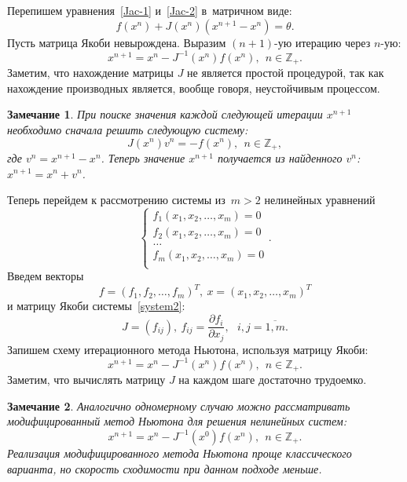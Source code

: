 \documentclass[11pt,a4paper,twoside,listtotoc,bibtotoc]{report}
\numberwithin{equation}{section}
\theoremstyle{definition}
\theoremstyle{plain}
\newtheorem*{note*}{Замечание}
\begin{document}
%
Перепишем уравнения~\eqref{Jac-1} и~\eqref{Jac-2} в~матричном виде:
%
\begin{equation}
%
    \label{matr_system1}
    f(x^n) + J(x^n)(x^{n + 1} - x^n) = \theta.
%
\end{equation}
%
Пусть матрица Якоби невырождена. Выразим $(n+1)$-ую итерацию
через $n$-ую:
%
\begin{equation}
%
    \label{matr_system2}
    x^{n + 1} = x^n - J^{-1}(x^n)f(x^n), ~~n\in\mathbb{Z_+}.
%
\end{equation}
%
Заметим, что нахождение матрицы $J$ не является простой процедурой, так как
нахождение производных является, вообще говоря, неустойчивым процессом.
%
\begin{note*}
%
При поиске значения каждой следующей итерации $x^{n + 1}$ необходимо сначала
решить следующую систему:
%
$$
    J(x^n)v^n = -f(x^n), ~~n\in\mathbb{Z_+},
$$
%
где $v^n = x^{n + 1} - x^n$. Теперь значение $x^{n + 1}$ получается из
найденного $v^n$: $x^{n + 1} = x^n + v^n$.
%
\end{note*}
%
Теперь перейдем к рассмотрению системы из~$m>2$ нелинейных уравнений
%
\begin{equation}
    \label{system2}
    \begin{cases}
        f_1(x_1,x_2,\dots,x_m) = 0 \\
        f_2(x_1,x_2,\dots,x_m) = 0 \\
        \dots \\
        f_m(x_1,x_2,\dots,x_m) = 0 \\
    \end{cases}.
\end{equation}
%
Введем векторы
%
$$
    f = (f_1,f_2,\dots,f_m)^T , ~x = (x_1,x_2,\dots,x_m)^T
$$
%
и матрицу Якоби системы~\eqref{system2}:
%
$$
    J = (f_{ij}),~f_{ij} = \frac{\partial f_i}{\partial x_j},
    ~~~i,j = \overline{1,m}.
$$
%
Запишем схему итерационного метода Ньютона, используя матрицу Якоби:
%
$$
    x^{n + 1} = x^n - J^{-1}(x^n)f(x^n), ~~n\in\mathbb{Z_+}.
$$
%
Заметим, что вычислять матрицу $J$ на каждом шаге достаточно трудоемко.

%
\begin{note*}
%
Аналогично одномерному случаю можно рассматривать модифицированный метод
Ньютона для решения нелинейных систем:
%
$$
    x^{n + 1} = x^n - J^{-1}(x^0)f(x^n), ~~n\in\mathbb{Z_+}.
$$
%
Реализация модифицированного метода Ньютона проще классического варианта,
но скорость сходимости при данном подходе меньше.
%
\end{note*}
%
%
\end{document}

